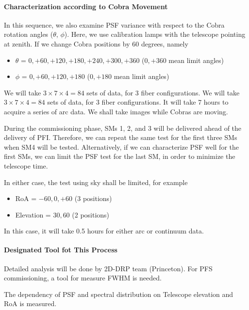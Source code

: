 \paragraph{Characterization according to Cobra Movement}
In this sequence, we also examine PSF variance with respect to the Cobra rotation angles ($\theta$, $\phi$).
Here, we use calibration lamps with the telescope pointing at zenith.
If we change Cobra positions by 60 degrees, namely
\begin{itemize}
\item $\theta$ = $0, +60, +120, +180, +240, +300, +360$ ($0, +360$ mean limit angles)
\item $\phi$ = $0, +60, +120, +180$ ($0, +180$ mean limit angles)
\end{itemize}
We will take $3 \times 7 \times 4 = 84$ sets of data, for 3 fiber configurations.
We will take $3 \times 7 \times 4 = 84$ sets of data, for 3 fiber configurations.
It will take 7 hours to acquire a series of arc data.
We shall take images while Cobras are moving.

\bigskip

During the commissioning phase, SMs 1, 2, and 3 will be delivered ahead of the delivery of PFI.
Therefore, we can repeat the same test for the first three SMs when SM4 will be tested.
Alternatively, if we can characterize PSF well for the first SMs, we can limit the PSF test for the last SM, in order to minimize the telescope time.

In either case, the test using sky shall be limited, for example
\begin{itemize}
\item RoA = $-60, 0, +60$ (3 positions)
\item Elevation = $30, 60$ (2 positions)
\end{itemize}
In this case, it will take 0.5 hours for either arc or continuum data.


\paragraph{Designated Tool fot This Process}
Detailed analysis will be done by 2D-DRP team (Princeton).
For PFS commissioning, a tool for measure FWHM is needed.

\begin{itembox}[l]{}
The dependency of PSF and spectral distribution on Telescope elevation and RoA is measured.

\end{itembox}
